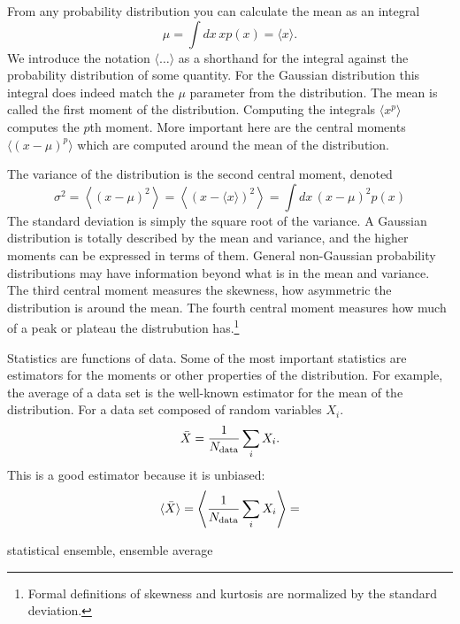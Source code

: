 From any probability distribution you can calculate the mean as an integral
\begin{equation}
  \mu = \int dx\,  x  p(x) = \langle x \rangle.
\end{equation}
We introduce the notation $\langle \dots \rangle$ as a shorthand for the integral against the probability distribution of some quantity.
For the Gaussian distribution this integral does indeed match the $\mu$ parameter from the distribution.  The mean is called the first moment of the distribution.  Computing the integrals $\langle x^p \rangle$ computes the $p$th moment.  More important here are the central moments $\langle (x-\mu)^p \rangle$ which are computed around the mean of the distribution.

The variance of the distribution is the second central moment, denoted
\begin{equation}
  \sigma^2 = \left\langle (x - \mu)^2 \right\rangle = \left\langle (x - \langle x \rangle)^2 \right\rangle =  \int dx\,  (x-\mu)^2  p(x) 
\end{equation}
The standard deviation is simply the square root of the variance.  A Gaussian distribution is totally described by the mean and variance, and the higher moments can be expressed in terms of them.  General non-Gaussian probability distributions may have information beyond what is in the mean and variance.   The third central moment measures the skewness, how asymmetric the distribution is around the mean.  The fourth central moment measures how much of a peak or plateau the distrubution has.\footnote{Formal definitions of skewness and kurtosis are normalized by the standard deviation.}  

Statistics are functions of data.  Some of the most important statistics are estimators for the moments or other properties of the distribution.  For example, the average of a data set is the well-known estimator for the mean of the distribution.  For a data set composed of random variables $X_i$.
\begin{equation}
  \bar X = \frac{1}{N_{\rm data}} \sum_i X_i.
\end{equation}
This is a good estimator because it is unbiased:
\begin{equation}
  \langle \bar X \rangle = \left\langle \frac{1}{N_{\rm data}} \sum_i X_i \right\rangle =
\end{equation}


statistical ensemble, ensemble average

